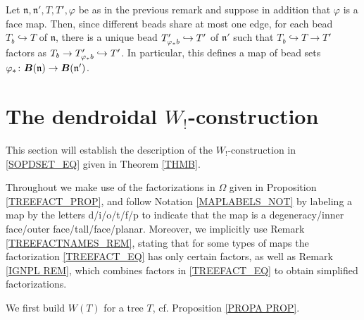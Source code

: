 \documentclass{hha}
\theoremstyle{definition} %
\begin{document}
\begin{remark}\label{BEADMAP REM}
	Let $\mathfrak{n},\mathfrak{n}',T,T',\varphi$ be as in the previous remark and suppose in addition that $\varphi$ is a face map.
%
	Then, since different beads share at most one edge,
	for each bead $T_{b} \hookrightarrow T$
	of $\mathfrak{n}$,
	there is a unique bead
	$T'_{\varphi_{\**} b} \hookrightarrow T'$
	of $\mathfrak{n}'$
	such that
	$T_b \hookrightarrow T \to T'$
	factors as
	$T_b \to T'_{\varphi_{\**}b} \hookrightarrow T'$.
%	
	In particular, 
	this defines a map of bead sets
	$\varphi_{\**} \colon 
	\boldsymbol{B}(\mathfrak{n}) \to 
	\boldsymbol{B}(\mathfrak{n}')$.
\end{remark}




\section{The dendroidal $W_!$-construction}\label{WCONS SEC}

This section will establish the description
of the $W_!$-construction in \eqref{SOPDSET_EQ}
given in Theorem \ref{THMB}.

Throughout we make  
use of the factorizations in $\Omega$ given in 
Proposition \ref{TREEFACT_PROP},
and follow Notation \ref{MAPLABELS_NOT}
by labeling a map by the letters d/i/o/t/f/p
to indicate that the map is
a degeneracy/inner face/outer face/tall/face/planar.
Moreover, we implicitly use
Remark \ref{TREEFACTNAMES_REM},
stating that for some types of maps the factorization 
\eqref{TREEFACT_EQ} has only certain factors,
as well as Remark \ref{IGNPL REM},
which combines factors in \eqref{TREEFACT_EQ}
to obtain simplified factorizations.
 
We first build $W(T)$ for a tree $T$, cf. Proposition \ref{PROPA PROP}.
\end{document}

